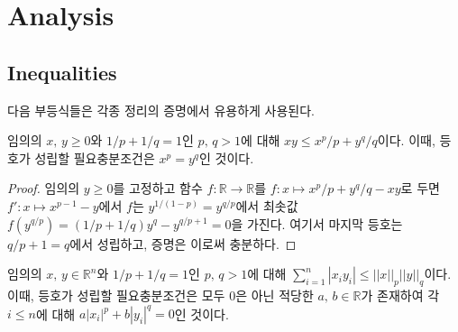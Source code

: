 \section{Analysis}
\subsection{Inequalities}

다음 부등식들은 각종 정리의 증명에서 유용하게 사용된다.

\begin{theorem}
    임의의 $x,\,y\geq0$와 $1/p+1/q=1$인 $p,\,q>1$에 대해 $xy\leq x^p/p+y^q/q$이다. 이때, 등호가 성립할 필요충분조건은 $x^p=y^q$인 것이다.
\end{theorem}

\begin{proof}
    임의의 $y\geq0$를 고정하고 함수 $f:\mathbb{R}\to\mathbb{R}$를 $f:x\mapsto x^p/p+y^q/q-xy$로 두면 $f':x\mapsto x^{p-1}-y$에서 $f$는 $y^{1/(1-p)}=y^{q/p}$에서 최솟값 $f(y^{q/p})=(1/p+1/q)y^q-y^{q/p+1}=0$을 가진다. 여기서 마지막 등호는 $q/p+1=q$에서 성립하고, 증명은 이로써 충분하다.
\end{proof}

\begin{theorem}
    임의의 $x,\,y\in\mathbb{R}^n$와 $1/p+1/q=1$인 $p,\,q>1$에 대해 $\sum_{i=1}^n|x_iy_i|\leq||x||_p||y||_q$이다. 이때, 등호가 성립할 필요충분조건은 모두 $0$은 아닌 적당한 $a,\,b\in\mathbb{R}$가 존재하여 각 $i\leq n$에 대해 $a|x_i|^p+b|y_i|^q=0$인 것이다.
\end{theorem}

